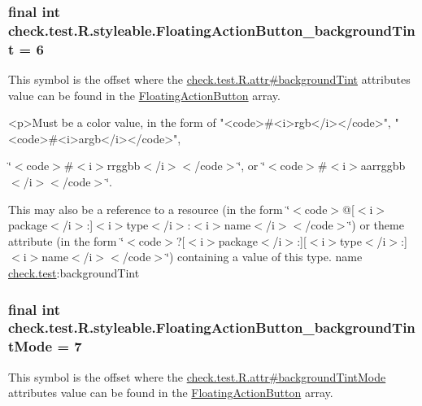 \subsubsection[{Floating\+Action\+Button\+\_\+background\+Tint}]{\setlength{\rightskip}{0pt plus 5cm}final int check.\+test.\+R.\+styleable.\+Floating\+Action\+Button\+\_\+background\+Tint = 6\hspace{0.3cm}{\ttfamily [static]}}\label{classcheck_1_1test_1_1_r_1_1styleable_a1f3f7c01b4b7fd997c371ce60234abad}
This symbol is the offset where the \hyperlink{classcheck_1_1test_1_1_r_1_1attr_a9fef2f05f0fb4a8733f460d560d8ef0d}{check.\+test.\+R.\+attr\#background\+Tint} attribute\textquotesingle{}s value can be found in the \hyperlink{classcheck_1_1test_1_1_r_1_1styleable_ae6f501c03537511d2edaad8d699781da}{Floating\+Action\+Button} array.

\begin{DoxyVerb}      <p>Must be a color value, in the form of "<code>#<i>rgb</i></code>", "<code>#<i>argb</i></code>",
\end{DoxyVerb}
 \char`\"{}$<$code$>$\#$<$i$>$rrggbb$<$/i$>$$<$/code$>$\char`\"{}, or \char`\"{}$<$code$>$\#$<$i$>$aarrggbb$<$/i$>$$<$/code$>$\char`\"{}. 

This may also be a reference to a resource (in the form \char`\"{}$<$code$>$@\mbox{[}$<$i$>$package$<$/i$>$\+:\mbox{]}$<$i$>$type$<$/i$>$\+:$<$i$>$name$<$/i$>$$<$/code$>$\char`\"{}) or theme attribute (in the form \char`\"{}$<$code$>$?\mbox{[}$<$i$>$package$<$/i$>$\+:\mbox{]}\mbox{[}$<$i$>$type$<$/i$>$\+:\mbox{]}$<$i$>$name$<$/i$>$$<$/code$>$\char`\"{}) containing a value of this type.  name \hyperlink{namespacecheck_1_1test}{check.\+test}\+:background\+Tint \hypertarget{classcheck_1_1test_1_1_r_1_1styleable_a9a94417aa77b157ee8ca3ac5e289b662}{}
\subsubsection[{Floating\+Action\+Button\+\_\+background\+Tint\+Mode}]{\setlength{\rightskip}{0pt plus 5cm}final int check.\+test.\+R.\+styleable.\+Floating\+Action\+Button\+\_\+background\+Tint\+Mode = 7\hspace{0.3cm}{\ttfamily [static]}}\label{classcheck_1_1test_1_1_r_1_1styleable_a9a94417aa77b157ee8ca3ac5e289b662}
This symbol is the offset where the \hyperlink{classcheck_1_1test_1_1_r_1_1attr_a30ef6484cfe3015f32395a912756a38f}{check.\+test.\+R.\+attr\#background\+Tint\+Mode} attribute\textquotesingle{}s value can be found in the \hyperlink{classcheck_1_1test_1_1_r_1_1styleable_ae6f501c03537511d2edaad8d699781da}{Floating\+Action\+Button} array.

